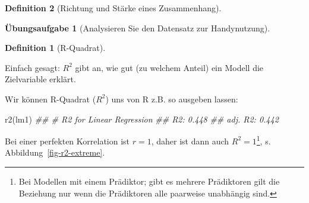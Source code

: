 \documentclass[
  a4paper,
  DIV=11]{scrreprt}
\newenvironment{Shaded}{\begin{snugshade}}{\end{snugshade}}
\newcommand{\DocumentationTok}[1]{\textcolor[rgb]{0.37,0.37,0.37}{\textit{#1}}}
\newcommand{\FunctionTok}[1]{\textcolor[rgb]{0.28,0.35,0.67}{#1}}
\newcommand{\NormalTok}[1]{\textcolor[rgb]{0.00,0.23,0.31}{#1}}
\theoremstyle{definition}
\newtheorem{exercise}{Übungsaufgabe}[chapter]
\theoremstyle{definition}
\theoremstyle{definition}
\newtheorem{definition}{Definition}[chapter]
\theoremstyle{remark}
\begin{document}
\begin{definition}[Richtung und Stärke eines
Zusammenhang]
\begin{exercise}[Analysieren Sie den Datensatz zur
Handynutzung]
\begin{definition}[R-Quadrat]
\end{definition}

Einfach gesagt: \(R^2\) gibt an, wie gut (zu welchem Anteil) ein Modell
die Zielvariable erklärt.

Wir können R-Quadrat (\(R^2\)) uns von R z.B. so ausgeben lassen:

\begin{Shaded}
\begin{Highlighting}[]
\FunctionTok{r2}\NormalTok{(lm1)}
\DocumentationTok{\#\# \# R2 for Linear Regression}
\DocumentationTok{\#\#        R2: 0.448}
\DocumentationTok{\#\#   adj. R2: 0.442}
\end{Highlighting}
\end{Shaded}

Bei einer perfekten Korrelation ist \(r=1\), daher ist dann auch
\(R^2 = 1\)\footnote{Bei Modellen mit einem Prädiktor; gibt es mehrere
  Prädiktoren gilt die Beziehung nur wenn die Prädiktoren alle paarweise
  unabhängig sind.}, s. Abbildung~\ref{fig-r2-extreme}.

\begin{figure}

\begin{minipage}{0.50\linewidth}



\end{minipage}%
%
\begin{minipage}{0.50\linewidth}


\end{minipage}
\end{figure}
\end{exercise}
\end{definition}
\end{document}
